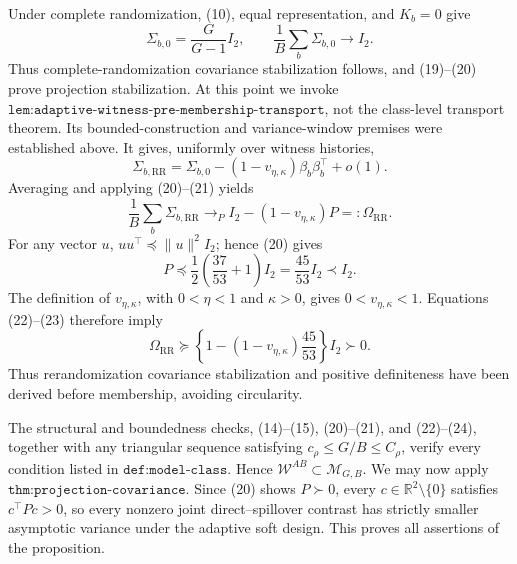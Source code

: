 Under complete randomization, (10), equal representation, and \(K_b=0\) give
\[
 \Sigma_{b,0}=\frac G{G-1}I_2,
 \qquad
 \frac1B\sum_b\Sigma_{b,0}\longrightarrow I_2.            \tag{21}
\]
Thus complete-randomization covariance stabilization follows, and (19)--(20) prove projection stabilization.  At this point we invoke \(\texttt{lem:adaptive-witness-pre-membership-transport}\), not the class-level transport theorem.  Its bounded-construction and variance-window premises were established above.  It gives, uniformly over witness histories,
\[
 \Sigma_{b,\mathrm{RR}}
 =\Sigma_{b,0}-(1-v_{\eta,\kappa})\beta_b\beta_b^\top+o(1).
\]
Averaging and applying (20)--(21) yields
\[
 \frac1B\sum_b\Sigma_{b,\mathrm{RR}}
 \longrightarrow_P I_2-(1-v_{\eta,\kappa})P
 =:\Omega_{\mathrm{RR}}.                                   \tag{22}
\]
For any vector \(u\), \(uu^\top\preceq\|u\|^2I_2\); hence (20) gives
\[
 P\preceq\frac12\left(\frac{37}{53}+1\right)I_2
 =\frac{45}{53}I_2\prec I_2.                               \tag{23}
\]
The definition of \(v_{\eta,\kappa}\), with \(0<\eta<1\) and \(\kappa>0\), gives \(0<v_{\eta,\kappa}<1\).  Equations (22)--(23) therefore imply
\[
 \Omega_{\mathrm{RR}}
 \succeq\left\{1-(1-v_{\eta,\kappa})\frac{45}{53}\right\}I_2
 \succ0.                                                    \tag{24}
\]
Thus rerandomization covariance stabilization and positive definiteness have been derived before membership, avoiding circularity.

The structural and boundedness checks, (14)--(15), (20)--(21), and (22)--(24), together with any triangular sequence satisfying \(c_\rho\leq G/B\leq C_\rho\), verify every condition listed in \(\texttt{def:model-class}\).  Hence \(\mathcal W^{AB}\subset\mathcal M_{G,B}\).  We may now apply \(\texttt{thm:projection-covariance}\).  Since (20) shows \(P\succ0\), every \(c\in\mathbb R^2\setminus\{0\}\) satisfies \(c^\top Pc>0\), so every nonzero joint direct--spillover contrast has strictly smaller asymptotic variance under the adaptive soft design.  This proves all assertions of the proposition.